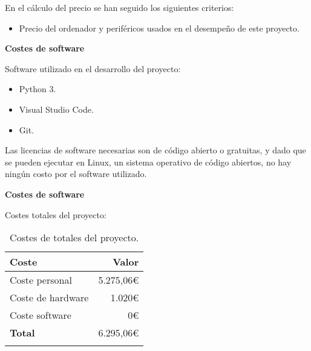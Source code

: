 En el cálculo del precio se han seguido los siguientes criterios:

\begin{itemize}
    \item Precio del ordenador y periféricos usados en el desempeño de este proyecto.
\end{itemize}

\textbf{Costes de software}

Software utilizado en el desarrollo del proyecto:

\begin{itemize}
    \item Python 3.
    \item Visual Studio Code.
    \item Git.
\end{itemize}

Las licencias de software necesarias son de código abierto o gratuitas, y dado que se pueden ejecutar en Linux, un sistema operativo de código abiertos, no hay ningún costo por el software utilizado.

\textbf{Costes de software}

Costes totales del proyecto:

\begin{longtable}[]{@{}lr@{}}
\toprule
\begin{minipage}[b]{0.38\columnwidth}\raggedright\strut
\textbf{Coste}\strut
\end{minipage} & \begin{minipage}[b]{0.20\columnwidth}\raggedright\strut
\textbf{Valor}\strut
\end{minipage}\tabularnewline
\midrule
\endhead
\begin{minipage}[t]{0.38\columnwidth}\raggedright\strut
Coste personal\strut
\end{minipage} & \begin{minipage}[t]{0.20\columnwidth}\raggedright\strut
5.275,06\euro{}\strut
\end{minipage}\tabularnewline
\begin{minipage}[t]{0.38\columnwidth}\raggedright\strut
Coste de hardware\strut
\end{minipage} & \begin{minipage}[t]{0.20\columnwidth}\raggedright\strut
1.020\euro{}\strut
\end{minipage}\tabularnewline
\begin{minipage}[t]{0.38\columnwidth}\raggedright\strut
Coste software\strut
\end{minipage} & \begin{minipage}[t]{0.20\columnwidth}\raggedright\strut
0\euro{}\strut
\end{minipage}\tabularnewline
\midrule
\begin{minipage}[t]{0.38\columnwidth}\raggedright\strut
\textbf{Total}\strut
\end{minipage} & \begin{minipage}[t]{0.20\columnwidth}\raggedright\strut
6.295,06\euro{}\strut
\end{minipage}\tabularnewline
\bottomrule
\caption{Costes de totales del proyecto.}
\end{longtable}

